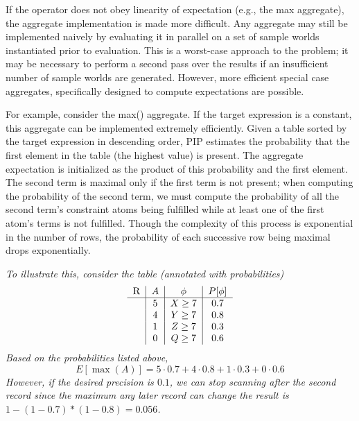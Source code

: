 If the operator does not obey linearity of expectation (e.g., the max aggregate), the aggregate implementation is made more difficult.  Any aggregate may still be implemented naively by evaluating it in parallel on a set of sample worlds instantiated prior to evaluation.  This is a worst-case approach to the problem; it may be necessary to perform a second pass over the results if an insufficient number of sample worlds are generated.  However, more efficient special case aggregates, specifically designed to compute expectations are possible.


For example, consider the max() aggregate.  If the target expression is a constant, this aggregate can be implemented extremely efficiently.  Given a table sorted by the target expression in descending order, PIP estimates the probability that the first element in the table (the highest value) is present.  The aggregate expectation is initialized as the product of this probability and the first element.  The second term is maximal only if the first term is not present; when computing the probability of the second term, we must compute the probability of all the second term's constraint atoms being fulfilled while at least one of the first atom's terms is not fulfilled.  Though the complexity of this process is exponential in the number of rows, the probability of each successive row being maximal drops exponentially.  

\begin{example}\em
To illustrate this, consider the table (annotated with probabilities)
\[
\begin{tabular}{c|c|c|c}
R & $A$ & $\phi$ & $P[\phi]$\\
\hline
& 5 & $X \ge 7$ & 0.7 \\
& 4 & $Y \ge 7$ & 0.8  \\
& 1 & $Z \ge 7$ & 0.3  \\
& 0 & $Q \ge 7$ & 0.6  \\
\end{tabular}
\]
Based on the probabilities listed above,
$$E[\max(A)] = 5 \cdot 0.7 + 4 \cdot 0.8 + 1 \cdot 0.3 + 0 \cdot 0.6$$
However, if the desired precision is $0.1$, we can stop scanning after the second record since the maximum any later record can change the result is $1-(1-0.7)*(1-0.8) = 0.056$.

\end{example}







